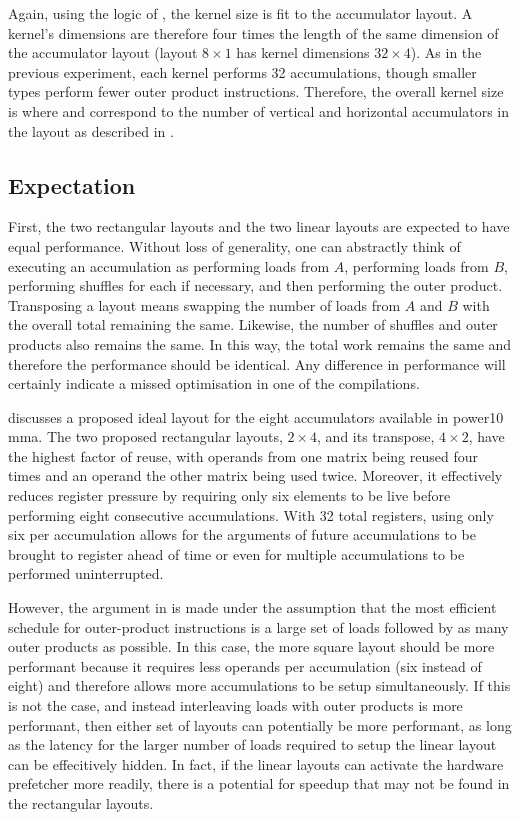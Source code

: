 \documentclass[\main/thesis.tex]{subfiles}
\begin{document}
Again, using the logic of , the kernel size is fit to the accumulator layout.
A kernel's dimensions are therefore four times the length of the same dimension of the accumulator layout (\eg layout $8 \times 1$ has kernel dimensions $32 \times 4$).
As in the previous experiment, each kernel performs 32 accumulations, though smaller types perform fewer outer product instructions.
Therefore, the overall kernel size is  where  and  correspond to the number of vertical and horizontal accumulators in the layout as described in .

\subsection{Expectation}
First, the two rectangular layouts and the two linear layouts are expected to have equal performance.
Without loss of generality, one can abstractly think of executing an accumulation as performing loads from $A$, performing loads from $B$, performing shuffles for each if necessary, and then performing the outer product.
Transposing a layout means swapping the number of loads from $A$ and $B$ with the overall total remaining the same.
Likewise, the number of shuffles and outer products also remains the same.
In this way, the total work remains the same and therefore the performance should be identical.
Any difference in performance will certainly indicate a missed optimisation in one of the compilations.

 discusses a proposed ideal layout for the eight accumulators available in \gls{power10} \gls{mma}.
The two proposed rectangular layouts, $2 \times 4$, and its transpose, $4 \times 2$, have the highest factor of reuse, with operands from one matrix being reused four times and an operand the other matrix being used twice.
Moreover, it effectively reduces register pressure by requiring only six elements to be \gls{live} before performing eight consecutive accumulations.
With 32 total registers, using only six per accumulation allows for the arguments of future accumulations to be brought to register ahead of time or even for multiple accumulations to be performed uninterrupted.

However, the argument in  is made under the assumption that the most efficient schedule for outer-product instructions is a large set of loads followed by as many outer products as possible.
In this case, the more square layout should be more performant because it requires less operands per accumulation (six instead of eight) and therefore allows more accumulations to be setup simultaneously.
If this is not the case, and instead interleaving loads with outer products is more performant, then either set of layouts can potentially be more performant, as long as the latency for the larger number of loads required to setup the linear layout can be effecitively hidden.
In fact, if the linear layouts can activate the hardware prefetcher more readily, there is a potential for speedup that may not be found in the rectangular layouts.
\end{document}
